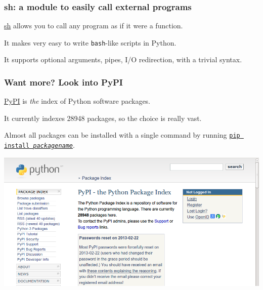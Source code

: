 \documentclass[english,serif,mathserif,xcolor=pdftex,dvipsnames,table]{beamer}
\begin{document}
\begin{frame}
  \frametitle{sh: a module to easily call external programs}

  \href{http://amoffat.github.com/sh/}{sh} allows you to call any
  program as if it were a function.

  \+

  It makes very easy to write \texttt{bash}-like scripts in Python.

  \+

  It supports optional arguments, pipes, I/O redirection, with a
  trivial syntax.
\end{frame}

\begin{frame}
  \frametitle{Want more? Look into PyPI}

  \href{http://pypi.python.org}{PyPI} is \emph{the} index of Python software packages.

  \+ It currently indexes 28948 packages, so the choice is really vast.

  \+ Almost all packages can be installed with a single command by
  running \href{https://pypi.python.org/pypi/pip}{\texttt{pip install
    \emph{packagename}}}.

\includegraphics[width=1\textwidth]{fig/pypi_screenshot.png}
\end{frame}
\end{document}
